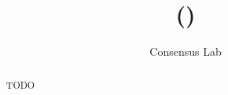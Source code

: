 \documentclass[11pt,a4paper]{article}
\begin{document}
\title{\ipcFull (\ipc)}
\date{}
\author{Consensus Lab}

\maketitle
\begin{abstract}
TODO
\end{abstract}









 




\appendix
\newpage
% 
% 
% 
% 

\end{document}
